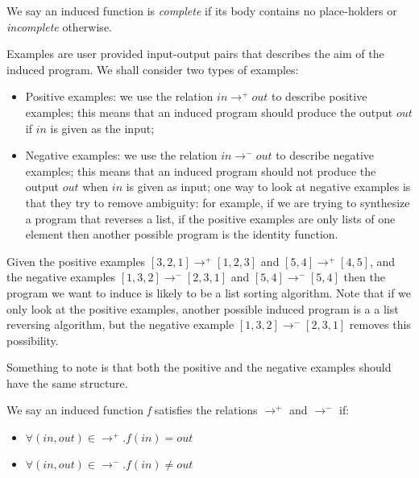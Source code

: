 \indent We say an induced function is \textit{complete} if its body contains no place-holders or \textit{incomplete} otherwise.

\begin{defn}
Examples are user provided input-output pairs that describes the aim of the induced program.
We shall consider two types of examples:
\begin{itemize}
	\item Positive examples: we use the relation $in \rightarrow^{+} out$ to describe positive examples; this means that an induced program should produce the output $out$ if $in$ is given as the input;
	\item Negative examples: we use the relation $in \rightarrow^{-} out$ to describe negative examples; this means that an induced program should not produce the output $out$ when $in$ is given as input;  one way to look at negative examples is that they try to remove ambiguity: for example, if we are trying to synthesize a program that reverses a list, if the positive examples are only lists of one element then another possible program is the identity function.
\end{itemize}
\end{defn}

\begin{exam}
Given the positive examples $[3,2,1] \rightarrow^{+} [1,2,3]$ and $[5, 4] \rightarrow^{+} [4, 5]$, and the negative examples $[1,3,2] \rightarrow^{-} [2,3,1]$ and $[5,4] \rightarrow^{-} [5,4]$ then the program we want to induce is likely to be a list sorting algorithm. Note that if we only look at the positive examples, another possible induced program is a a list reversing algorithm, but the negative example $[1,3,2] \rightarrow^{-} [2,3,1]$ removes this possibility.
\end{exam}
Something to note is that both the positive and the negative examples should have the same structure.

\begin{defn}
We say an induced function \textit{f} satisfies the relations $\rightarrow^{+}$ and $\rightarrow^{-}$ if:
\begin{itemize}
\item $\forall (in, out) \in \rightarrow^{+} . f(in) = out$
\item $\forall (in, out) \in \rightarrow^{-} . f(in) \neq out$
\end{itemize}
\end{defn}

